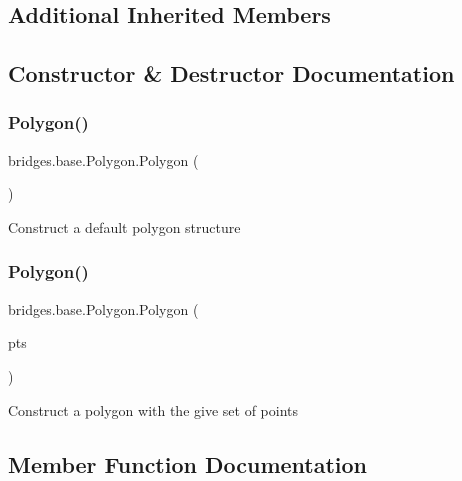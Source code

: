 \subsection*{Additional Inherited Members}


\subsection{Constructor \& Destructor Documentation}
\mbox{\label{classbridges_1_1base_1_1_polygon_af0c1b3bc3147ffbda98fd9c515a8052d}} 
\subsubsection{\texorpdfstring{Polygon()}{Polygon()}\hspace{0.1cm}{\footnotesize\ttfamily [1/2]}}
{\footnotesize\ttfamily bridges.\+base.\+Polygon.\+Polygon (\begin{DoxyParamCaption}{ }\end{DoxyParamCaption})}

Construct a default polygon structure \mbox{\label{classbridges_1_1base_1_1_polygon_a341cc297ba7f0f201d31aa3c98ecf108}} 
\subsubsection{\texorpdfstring{Polygon()}{Polygon()}\hspace{0.1cm}{\footnotesize\ttfamily [2/2]}}
{\footnotesize\ttfamily bridges.\+base.\+Polygon.\+Polygon (\begin{DoxyParamCaption}\item[{Array\+List$<$ Float $>$}]{pts }\end{DoxyParamCaption})}

Construct a polygon with the give set of points 

\subsection{Member Function Documentation}
\mbox{\label{classbridges_1_1base_1_1_polygon_a2203367acb1a26dfa1a81d69ce61274f}} 
